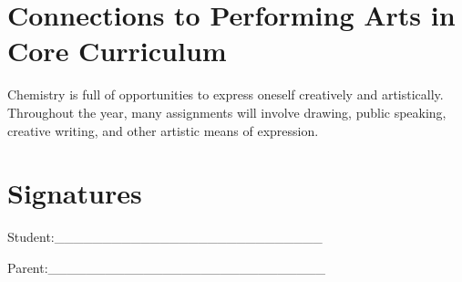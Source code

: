 \documentclass[11pt]{article}
\begin{document}
\section{Connections to Performing Arts in Core Curriculum}
\label{sec:org399d132}
Chemistry is full of opportunities to express oneself creatively and artistically. Throughout the year, many assignments will involve drawing, public speaking, creative writing, and other artistic means of expression.

\section{Signatures}
\label{sec:org54c1312}

Student:\_\_\_\_\_\_\_\_\_\_\_\_\_\_\_\_\_\_\_\_\_\_\_\_\_\_\_\_


Parent:\_\_\_\_\_\_\_\_\_\_\_\_\_\_\_\_\_\_\_\_\_\_\_\_\_\_\_\_\_
\end{document}
